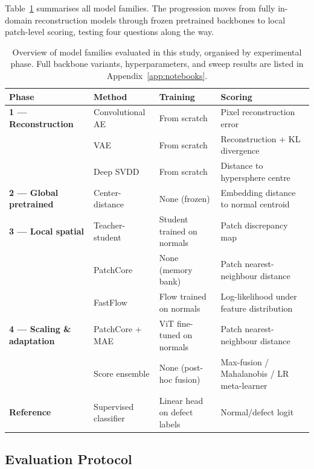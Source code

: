 \documentclass[11pt]{article}
\begin{document}
Table~\ref{tab:method_overview} summarises all model families. The progression
moves from fully in-domain reconstruction models through frozen pretrained
backbones to local patch-level scoring, testing four questions along the way.

\begin{table}[H]
\centering
\caption{Overview of model families evaluated in this study, organised by experimental phase.
Full backbone variants, hyperparameters, and sweep results are listed in Appendix~\ref{app:notebooks}.}
\label{tab:method_overview}
\begin{tabularx}{\linewidth}{>{\raggedright\arraybackslash}p{2.6cm}
                              >{\raggedright\arraybackslash}p{3.2cm}
                              >{\raggedright\arraybackslash}p{3.0cm}
                              >{\raggedright\arraybackslash}X}
\toprule
Phase & Method & Training & Scoring \\
\midrule
\textbf{1 — Reconstruction}
  & Convolutional AE   & From scratch              & Pixel reconstruction error \\
  & VAE                & From scratch              & Reconstruction + KL divergence \\
  & Deep SVDD          & From scratch              & Distance to hypersphere centre \\
\midrule
\textbf{2 — Global pretrained}
  & Center-distance    & None (frozen)             & Embedding distance to normal centroid \\
\midrule
\textbf{3 — Local spatial}
  & Teacher-student    & Student trained on normals & Patch discrepancy map \\
  & PatchCore          & None (memory bank)        & Patch nearest-neighbour distance \\
  & FastFlow           & Flow trained on normals   & Log-likelihood under feature distribution \\
\midrule
\textbf{4 — Scaling \& adaptation}
  & PatchCore + MAE    & ViT fine-tuned on normals & Patch nearest-neighbour distance \\
  & Score ensemble     & None (post-hoc fusion)    & Max-fusion / Mahalanobis / LR meta-learner \\
\midrule
\textbf{Reference}
  & Supervised classifier & Linear head on defect labels & Normal/defect logit \\
\bottomrule
\end{tabularx}
\end{table}

\subsection{Evaluation Protocol}
\end{document}
